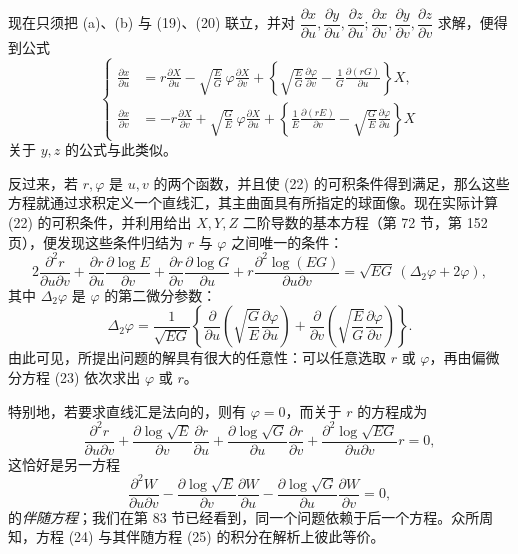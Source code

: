 现在只须把 (a)、(b) 与 (19)、(20) 联立，并对
\(\dfrac{\partial x}{\partial u},\dfrac{\partial y}{\partial u},\dfrac{\partial z}{\partial u};
\dfrac{\partial x}{\partial v},\dfrac{\partial y}{\partial v},\dfrac{\partial z}{\partial v}\)
求解，便得到公式
\begin{equation}\tag{22}
\left\{
\begin{aligned}
\frac{\partial x}{\partial u}&=r\frac{\partial X}{\partial u}-\sqrt{\frac EG}\,\varphi\frac{\partial X}{\partial v}
+\left\{\sqrt{\frac EG}\frac{\partial\varphi}{\partial v}-\frac1G\frac{\partial(rG)}{\partial u}\right\}X,\\[0.4em]
\frac{\partial x}{\partial v}&=-r\frac{\partial X}{\partial v}+\sqrt{\frac GE}\,\varphi\frac{\partial X}{\partial u}
+\left\{\frac1E\frac{\partial(rE)}{\partial v}-\sqrt{\frac GE}\frac{\partial\varphi}{\partial u}\right\}X
\end{aligned}
\right.
\end{equation}
关于 \(y,z\) 的公式与此类似。

反过来，若 \(r,\varphi\) 是 \(u,v\) 的两个函数，并且使 (22) 的可积条件得到满足，那么这些方程就通过求积定义一个直线汇，其主曲面具有所指定的球面像。现在实际计算 (22) 的可积条件，并利用给出 \(X,Y,Z\) 二阶导数的基本方程（第 72 节，第 152 页），便发现这些条件归结为 \(r\) 与 \(\varphi\) 之间唯一的条件：
\begin{equation}\tag{23}
2\frac{\partial^2 r}{\partial u\partial v}
+\frac{\partial r}{\partial u}\frac{\partial\log E}{\partial v}
+\frac{\partial r}{\partial v}\frac{\partial\log G}{\partial u}
+r\frac{\partial^2\log(EG)}{\partial u\partial v}
=\sqrt{EG}\,(\Delta_2\varphi+2\varphi),
\end{equation}
其中 \(\Delta_2\varphi\) 是 \(\varphi\) 的第二微分参数：
\[
 \Delta_2\varphi=\frac1{\sqrt{EG}}
 \left\{\frac{\partial}{\partial u}\left(\sqrt{\frac GE}\frac{\partial\varphi}{\partial u}\right)
 +\frac{\partial}{\partial v}\left(\sqrt{\frac EG}\frac{\partial\varphi}{\partial v}\right)\right\}.
\]
由此可见，所提出问题的解具有很大的任意性：可以任意选取 \(r\) 或 \(\varphi\)，再由偏微分方程 (23) 依次求出 \(\varphi\) 或 \(r\)。

特别地，若要求直线汇是法向的，则有 \(\varphi=0\)，而关于 \(r\) 的方程成为
\begin{equation}\tag{24}
\frac{\partial^2 r}{\partial u\partial v}
+\frac{\partial\log\sqrt E}{\partial v}\frac{\partial r}{\partial u}
+\frac{\partial\log\sqrt G}{\partial u}\frac{\partial r}{\partial v}
+\frac{\partial^2\log\sqrt{EG}}{\partial u\partial v}r=0,
\end{equation}
这恰好是另一方程
\begin{equation}\tag{25}
\frac{\partial^2 W}{\partial u\partial v}
-\frac{\partial\log\sqrt E}{\partial v}\frac{\partial W}{\partial u}
-\frac{\partial\log\sqrt G}{\partial u}\frac{\partial W}{\partial v}=0,
\end{equation}
的\emph{伴随方程}；我们在第 83 节已经看到，同一个问题依赖于后一个方程。众所周知，方程 (24) 与其伴随方程 (25) 的积分在解析上彼此等价。


